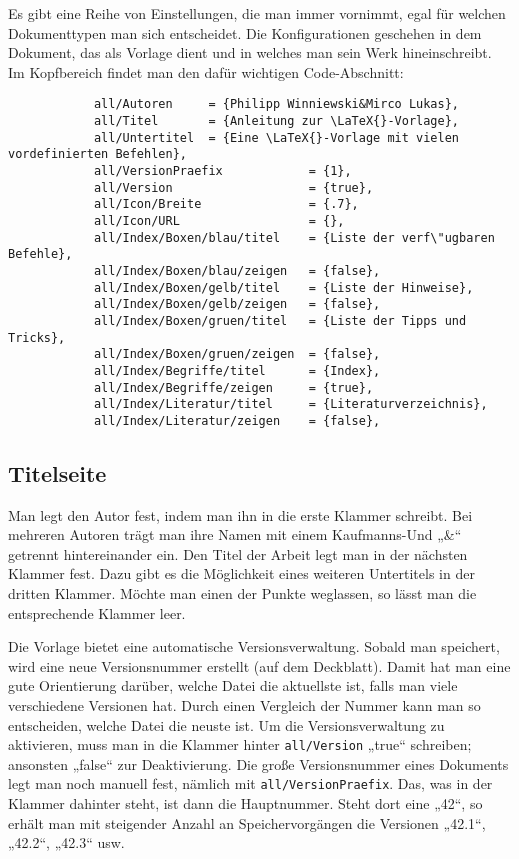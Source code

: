 			Es gibt eine Reihe von Einstellungen, die man immer vornimmt, egal für welchen Dokumenttypen man sich entscheidet. Die Konfigurationen geschehen in dem Dokument, das als Vorlage dient und in welches man sein Werk hineinschreibt. Im Kopfbereich findet man den dafür wichtigen Code-Abschnitt:

			\begin{verbatim}
			all/Autoren     = {Philipp Winniewski&Mirco Lukas},
			all/Titel       = {Anleitung zur \LaTeX{}-Vorlage},
			all/Untertitel  = {Eine \LaTeX{}-Vorlage mit vielen vordefinierten Befehlen},
			all/VersionPraefix            = {1},
			all/Version                   = {true},
			all/Icon/Breite               = {.7},
			all/Icon/URL                  = {},
			all/Index/Boxen/blau/titel    = {Liste der verf\"ugbaren Befehle},
			all/Index/Boxen/blau/zeigen   = {false},
			all/Index/Boxen/gelb/titel    = {Liste der Hinweise},
			all/Index/Boxen/gelb/zeigen   = {false},
			all/Index/Boxen/gruen/titel   = {Liste der Tipps und Tricks},
			all/Index/Boxen/gruen/zeigen  = {false},
			all/Index/Begriffe/titel      = {Index},
			all/Index/Begriffe/zeigen     = {true},
			all/Index/Literatur/titel     = {Literaturverzeichnis},
			all/Index/Literatur/zeigen    = {false},
			\end{verbatim}

			\subsection{Titelseite}

				Man legt den Autor fest, indem man ihn in die erste Klammer schreibt. Bei mehreren Autoren trägt man ihre Namen mit einem Kaufmanns-Und „\&“ getrennt hintereinander ein. Den Titel der Arbeit legt man in der nächsten Klammer fest. Dazu gibt es die Möglichkeit eines weiteren Untertitels in der dritten Klammer. Möchte man einen der Punkte weglassen, so lässt man die entsprechende Klammer leer.

				Die Vorlage bietet eine automatische Versionsverwaltung. Sobald man speichert, wird eine neue Versionsnummer erstellt (auf dem Deckblatt). Damit hat man eine gute Orientierung darüber, welche Datei die aktuellste ist, falls man viele verschiedene Versionen hat. Durch einen Vergleich der Nummer kann man so entscheiden, welche Datei die neuste ist. Um die Versionsverwaltung zu aktivieren, muss man in die Klammer hinter \texttt{all/Version} „true“ schreiben; ansonsten „false“ zur Deaktivierung. Die große Versionsnummer eines Dokuments legt man noch manuell fest, nämlich mit \texttt{all/VersionPraefix}. Das, was in der Klammer dahinter steht, ist dann die Hauptnummer. Steht dort eine „42“, so erhält man mit steigender Anzahl an Speichervorgängen die Versionen „42.1“, „42.2“, „42.3“ usw.

